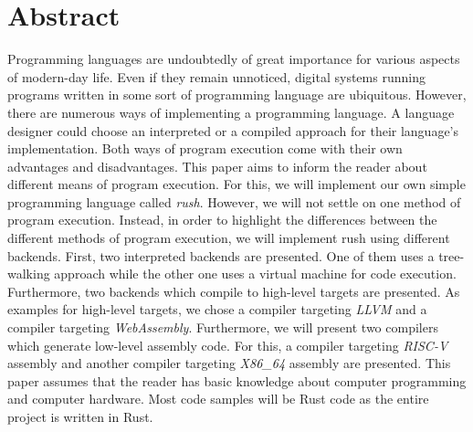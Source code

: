 \chapter{Abstract}

Programming languages are undoubtedly of great importance for various aspects of
modern-day life. Even if they remain unnoticed, digital systems running programs
written in some sort of programming language are ubiquitous.
However, there are numerous ways of implementing a programming language. A
language designer could choose an interpreted or a compiled approach for their
language's implementation. Both ways of program execution come with their own
advantages and disadvantages.
\newline
This paper aims to inform the reader about different means of program execution.
For this, we will implement our own simple programming language called \emph{rush}.
However, we will not settle on one method of program execution. Instead, in
order to highlight the differences between the different methods of program
execution, we will implement rush using different backends.
First, two interpreted backends are presented. One of them uses a tree-walking
approach while the other one uses a virtual machine for code execution.
Furthermore, two backends which compile to high-level targets are presented. As
examples for high-level targets, we chose a compiler targeting \emph{LLVM} and a
compiler targeting \emph{WebAssembly}. Furthermore, we will present two compilers
which generate low-level assembly code. For this, a compiler targeting \emph{RISC-V}
assembly and another compiler targeting \emph{X86\_64} assembly are presented.
\newline
This paper assumes that the reader has basic knowledge about computer
programming and computer hardware. Most code samples will be Rust code as the
entire project is written in Rust.

